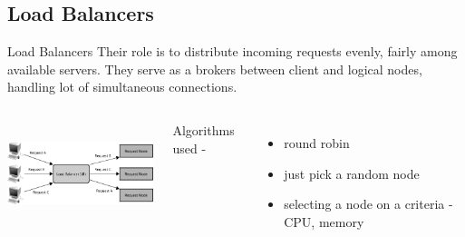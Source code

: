 \documentclass[9pt]{beamer}
\begin{document}
\subsection{Load Balancers}
\begin{frame}{Load Balancers}
  Their role is to distribute incoming requests evenly, fairly among available servers. They serve as a
  brokers between client and logical nodes, handling lot of simultaneous connections.

  \pause
 \begin{columns}
    \includegraphics[width=60mm, height=30mm, scale=0.4]{img/loadBalancer.png}

    Algorithms used - 
    \begin{itemize}
    \item round robin
    \item just pick a random node
    \item selecting a node on a criteria - CPU, memory
    \end{itemize}
  \end{columns}
\end{frame}

\end{document}
